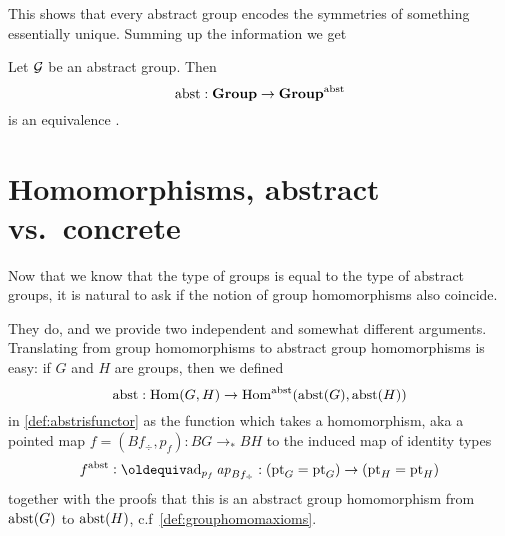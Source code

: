 This shows that every abstract group encodes the symmetries of something essentially unique.  Summing up the information we get
\begin{theorem}
  \label{lem:Groupsareidentitytypes}Let ${\mathcal G}$ be an abstract group.  
Then
$$\mathrm{abst}:\mathbf{Group}\to\mathbf{Group}^{\mathrm{abst}}$$ is an equivalence%
.
\end{theorem}

\section{Homomorphisms, abstract vs.~concrete}
\label{sec:homabsisconcr}

Now that we know that the type of groups is equal to the type of abstract groups, it is natural to ask if the notion of group homomorphisms also coincide.  

They do, and we provide two independent and somewhat different arguments.  Translating from group homomorphisms to abstract group homomorphisms is easy: if $G$ and $H$ are groups, then we defined 
$$\mathrm{abst}:\mathrm{Hom}(G,H)\to\mathrm{Hom}^{\mathrm{abst}}(\mathrm{abst}(G),\mathrm{abst}(H))$$
in \cref{def:abstrisfunctor} as the function which takes a homomorphism, aka a pointed map $f=(Bf_\div,p_f):BG\to_*BH$ to the induced map of identity types 
$$f^\abstr\defequi \mathrm{ad}_{p_f}\ap{Bf_\div}:(\pt_G=\pt_G)\to(\pt_H=\pt_H)$$
 together with the proofs that this is an abstract group homomorphism from $\mathrm{abst}(G)$ to $\mathrm{abst}(H)$, c.f~\cref{def:grouphomomaxioms}.


